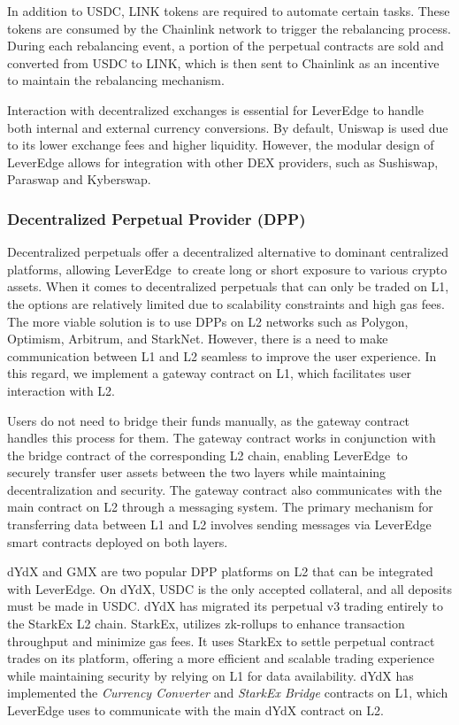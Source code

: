 In addition to USDC, LINK tokens are required to automate certain tasks. These tokens are consumed by the Chainlink network to trigger the rebalancing process. During each rebalancing event, a portion of the perpetual contracts are sold and converted from USDC to LINK, which is then sent to Chainlink as an incentive to maintain the rebalancing mechanism. 

Interaction with decentralized exchanges is essential for LeverEdge to handle both internal and external currency conversions. By default, Uniswap is used due to its lower exchange fees and higher liquidity. However, the modular design of LeverEdge allows for integration with other DEX providers, such as Sushiswap, Paraswap and Kyberswap.

\subsubsection{Decentralized Perpetual Provider (DPP)}
Decentralized perpetuals offer a decentralized alternative to dominant centralized platforms, allowing LeverEdge\ to create long or short exposure to various crypto assets. When it comes to decentralized perpetuals that can only be traded on L1, the options are relatively limited due to scalability constraints and high gas fees. The more viable solution is to use DPPs on L2 networks such as Polygon, Optimism, Arbitrum, and StarkNet. However, there is a need to make communication between L1 and L2 seamless to improve the user experience. In this regard, we implement a gateway contract on L1, which facilitates user interaction with L2. 

Users do not need to bridge their funds manually, as the gateway contract handles this process for them. The gateway contract works in conjunction with the bridge contract of the corresponding L2 chain, enabling LeverEdge\ to securely transfer user assets between the two layers while maintaining decentralization and security. The gateway contract also communicates with the main contract on L2 through a messaging system. The primary mechanism for transferring data between L1 and L2 involves sending messages via LeverEdge smart contracts deployed on both layers.

dYdX and GMX are two popular DPP platforms on L2 that can be integrated with LeverEdge. On dYdX, USDC is the only accepted collateral, and all deposits must be made in USDC. dYdX has migrated its perpetual v3 trading entirely to the StarkEx L2 chain. StarkEx, utilizes zk-rollups to enhance transaction throughput and minimize gas fees. It uses StarkEx to settle perpetual contract trades on its platform, offering a more efficient and scalable trading experience while maintaining security by relying on L1 for data availability. dYdX has implemented the \textit{Currency Converter} and \textit{StarkEx Bridge} contracts on L1, which LeverEdge uses to communicate with the main dYdX contract on L2.

